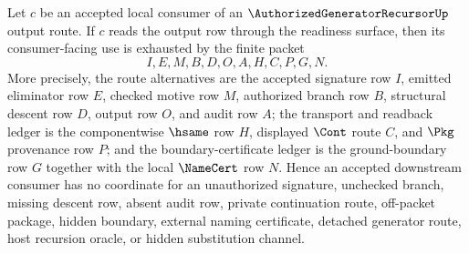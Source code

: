 \begin{lemma}
\label{lem:authorized-generator-recursor-output-route-downstream-coverage}
Let $c$ be an accepted local consumer of an $\AuthorizedGeneratorRecursorUp$ output route. If $c$ reads the output row through the readiness surface, then its consumer-facing use is exhausted by the finite packet
$$
I,E,M,B,D,O,A,H,C,P,G,N.
$$
More precisely, the route alternatives are the accepted signature row $I$, emitted eliminator row $E$, checked motive row $M$, authorized branch row $B$, structural descent row $D$, output row $O$, and audit row $A$; the transport and readback ledger is the componentwise $\hsame$ row $H$, displayed $\Cont$ route $C$, and $\Pkg$ provenance row $P$; and the boundary-certificate ledger is the ground-boundary row $G$ together with the local $\NameCert$ row $N$. Hence an accepted downstream consumer has no coordinate for an unauthorized signature, unchecked branch, missing descent row, absent audit row, private continuation route, off-packet package, hidden boundary, external naming certificate, detached generator route, host recursion oracle, or hidden substitution channel.
\end{lemma}
